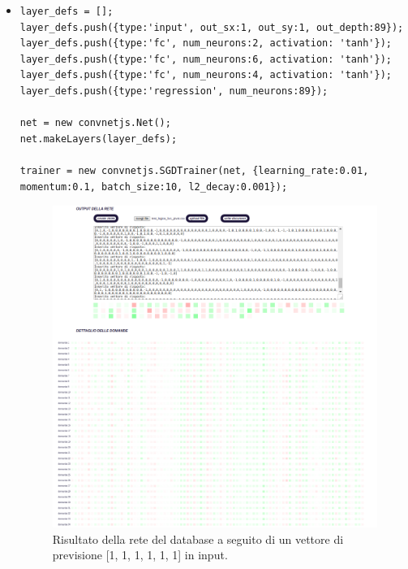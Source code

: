 \begin{itemize}
\item \begin{verbatim}
layer_defs = [];
layer_defs.push({type:'input', out_sx:1, out_sy:1, out_depth:89});
layer_defs.push({type:'fc', num_neurons:2, activation: 'tanh'});
layer_defs.push({type:'fc', num_neurons:6, activation: 'tanh'});
layer_defs.push({type:'fc', num_neurons:4, activation: 'tanh'});
layer_defs.push({type:'regression', num_neurons:89});

net = new convnetjs.Net();
net.makeLayers(layer_defs);

trainer = new convnetjs.SGDTrainer(net, {learning_rate:0.01,
momentum:0.1, batch_size:10, l2_decay:0.001});
\end{verbatim}

\begin{figure}[H]
\centering
	\includegraphics[width=0.90\linewidth]{./image/rete_db-vp1.png}
	\caption{Risultato della rete del database a seguito di un vettore di previsione [1, 1, 1, 1, 1, 1] in input.}
\end{figure}


\end{itemize}

